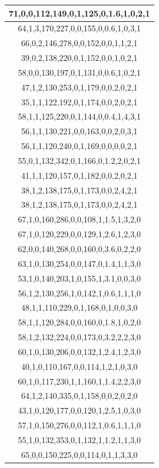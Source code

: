 \documentclass{article}
\begin{document}
\begin{table}[h!]
\begin{tabular}{|c|}
71,0,0,112,149,0,1,125,0,1.6,1,0,2,1 \\ \hline
64,1,3,170,227,0,0,155,0,0.6,1,0,3,1 \\ \hline
66,0,2,146,278,0,0,152,0,0,1,1,2,1 \\ \hline
39,0,2,138,220,0,1,152,0,0,1,0,2,1 \\ \hline
58,0,0,130,197,0,1,131,0,0.6,1,0,2,1 \\ \hline
47,1,2,130,253,0,1,179,0,0,2,0,2,1 \\ \hline
35,1,1,122,192,0,1,174,0,0,2,0,2,1 \\ \hline
58,1,1,125,220,0,1,144,0,0.4,1,4,3,1 \\ \hline
56,1,1,130,221,0,0,163,0,0,2,0,3,1 \\ \hline
56,1,1,120,240,0,1,169,0,0,0,0,2,1 \\ \hline
55,0,1,132,342,0,1,166,0,1.2,2,0,2,1 \\ \hline
41,1,1,120,157,0,1,182,0,0,2,0,2,1 \\ \hline
38,1,2,138,175,0,1,173,0,0,2,4,2,1 \\ \hline
38,1,2,138,175,0,1,173,0,0,2,4,2,1 \\ \hline
67,1,0,160,286,0,0,108,1,1.5,1,3,2,0 \\ \hline
67,1,0,120,229,0,0,129,1,2.6,1,2,3,0 \\ \hline
62,0,0,140,268,0,0,160,0,3.6,0,2,2,0 \\ \hline
63,1,0,130,254,0,0,147,0,1.4,1,1,3,0 \\ \hline
53,1,0,140,203,1,0,155,1,3.1,0,0,3,0 \\ \hline
56,1,2,130,256,1,0,142,1,0.6,1,1,1,0 \\ \hline
48,1,1,110,229,0,1,168,0,1,0,0,3,0 \\ \hline
58,1,1,120,284,0,0,160,0,1.8,1,0,2,0 \\ \hline
58,1,2,132,224,0,0,173,0,3.2,2,2,3,0 \\ \hline
60,1,0,130,206,0,0,132,1,2.4,1,2,3,0 \\ \hline
40,1,0,110,167,0,0,114,1,2,1,0,3,0 \\ \hline
60,1,0,117,230,1,1,160,1,1.4,2,2,3,0 \\ \hline
64,1,2,140,335,0,1,158,0,0,2,0,2,0 \\ \hline
43,1,0,120,177,0,0,120,1,2.5,1,0,3,0 \\ \hline
57,1,0,150,276,0,0,112,1,0.6,1,1,1,0 \\ \hline
55,1,0,132,353,0,1,132,1,1.2,1,1,3,0 \\ \hline
65,0,0,150,225,0,0,114,0,1,1,3,3,0 \\ \hline

\end{tabular}
\end{table}
\end{document}
